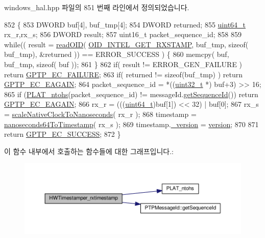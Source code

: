 windows\+\_\+hal.\+hpp 파일의 851 번째 라인에서 정의되었습니다.


\begin{DoxyCode}
852     \{
853         DWORD buf[4], buf\_tmp[4];
854         DWORD returned;
855         \hyperlink{parse_8c_aec6fcb673ff035718c238c8c9d544c47}{uint64\_t} rx\_r,rx\_s;
856         DWORD result;
857         uint16\_t packet\_sequence\_id;
858 
859         \textcolor{keywordflow}{while}(( result = \hyperlink{class_windows_ether_timestamper_ac5b503366553291b2c8f0a2b1a84219e}{readOID}( \hyperlink{windows__hal_8hpp_ad4b6bad3efdf67de170fad274a68ba40}{OID\_INTEL\_GET\_RXSTAMP}, buf\_tmp, \textcolor{keyword}{sizeof}(
      buf\_tmp), &returned )) == ERROR\_SUCCESS ) \{
860             memcpy( buf, buf\_tmp, \textcolor{keyword}{sizeof}( buf ));
861         \}
862         \textcolor{keywordflow}{if}( result != ERROR\_GEN\_FAILURE ) \textcolor{keywordflow}{return} \hyperlink{ieee1588_8hpp_ab75a746f471bd4537a099d86b38d78c1}{GPTP\_EC\_FAILURE};
863         \textcolor{keywordflow}{if}( returned != \textcolor{keyword}{sizeof}(buf\_tmp) ) \textcolor{keywordflow}{return} \hyperlink{ieee1588_8hpp_aee74e806e4f7deb78c6adee61f5dac87}{GPTP\_EC\_EAGAIN};
864         packet\_sequence\_id = *((\hyperlink{parse_8c_a6eb1e68cc391dd753bc8ce896dbb8315}{uint32\_t} *) buf+3) >> 16;
865         \textcolor{keywordflow}{if} (\hyperlink{linux_2src_2platform_8cpp_a6b8f3e7b87b66fa774a07ddc67f883a7}{PLAT\_ntohs}(packet\_sequence\_id) != messageId.\hyperlink{class_p_t_p_message_id_abd5cac5701120cbbfc56129b31fa801f}{getSequenceId}()) \textcolor{keywordflow}{return} 
      \hyperlink{ieee1588_8hpp_aee74e806e4f7deb78c6adee61f5dac87}{GPTP\_EC\_EAGAIN};
866         rx\_r = (((\hyperlink{parse_8c_aec6fcb673ff035718c238c8c9d544c47}{uint64\_t})buf[1]) << 32) | buf[0];
867         rx\_s = \hyperlink{class_windows_ether_timestamper_a4644902a8381abd3a06e9caa3bdd8262}{scaleNativeClockToNanoseconds}( rx\_r );
868         timestamp = \hyperlink{class_windows_ether_timestamper_a7c702f26e7228347c2dd9ca9f481ecb5}{nanoseconds64ToTimestamp}( rx\_s );
869         timestamp.\hyperlink{class_timestamp_a8fab72cfd922b5757580642c2309e9bd}{\_version} = \hyperlink{class_common_timestamper_ab22abc2906422da61885ac6c8e6a1a59}{version};
870 
871         \textcolor{keywordflow}{return} \hyperlink{ieee1588_8hpp_a57ed3a54df25c6db88b00f685f517920}{GPTP\_EC\_SUCCESS};
872     \}
\end{DoxyCode}


이 함수 내부에서 호출하는 함수들에 대한 그래프입니다.\+:
\nopagebreak
\begin{figure}[H]
\begin{center}
\leavevmode
\includegraphics[width=350pt]{class_windows_ether_timestamper_a9dc0ab7dd51322bf334ba8fe1d4e77a9_cgraph}
\end{center}
\end{figure}


